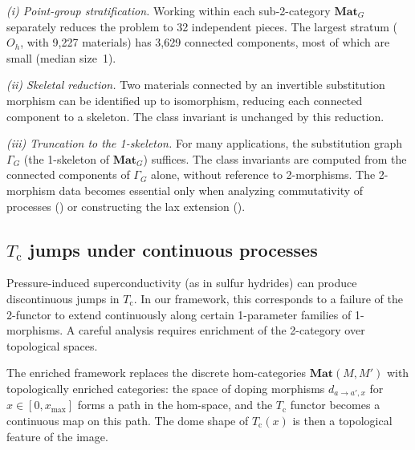 \documentclass[12pt,a4paper]{article}
\theoremstyle{plain}
\theoremstyle{definition}
\theoremstyle{remark}
\newcommand{\Tc}{T_{\mathrm{c}}}
\newcommand{\Matl}{\mathbf{Mat}}
\newcommand{\MatlG}{\mathbf{Mat}_G}
\begin{document}
\emph{(i) Point-group stratification.}  Working within each sub-2-category
$\MatlG$ separately reduces the problem to 32 independent pieces.  The
largest stratum ($O_h$, with 9{,}227 materials) has 3{,}629 connected
components, most of which are small (median size~1).

\emph{(ii) Skeletal reduction.}  Two materials connected by an invertible
substitution morphism can be identified up to isomorphism, reducing each
connected component to a skeleton.  The class invariant is unchanged by
this reduction.

\emph{(iii) Truncation to the 1-skeleton.}  For many applications,
the substitution graph $\Gamma_G$ (the 1-skeleton of $\MatlG$) suffices.
The class invariants are computed from the connected components of
$\Gamma_G$ alone, without reference to 2-morphisms.  The 2-morphism data
becomes essential only when analyzing commutativity of processes
() or constructing the lax extension
().

\subsection{$\Tc$ jumps under continuous processes}

Pressure-induced superconductivity (as in sulfur hydrides) can produce
discontinuous jumps in $\Tc$.  In our framework, this corresponds to a
failure of the 2-functor to extend continuously along certain 1-parameter
families of 1-morphisms.  A careful analysis requires enrichment of the
2-category over topological spaces.

The enriched framework replaces the discrete hom-categories
$\Matl(M, M')$ with topologically enriched categories: the space of
doping morphisms $d_{a \to a', x}$ for $x \in [0, x_{\max}]$ forms a
path in the hom-space, and the $\Tc$ functor becomes a continuous map
on this path.  The dome shape of $\Tc(x)$ is then a topological feature
of the image.
\end{document}

